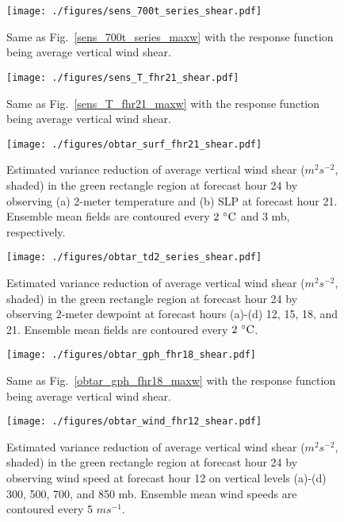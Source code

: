 \documentclass{ttuthes2007}
\begin{document}
\begin{figure}[!tb]
  \centering
  \noindent\texttt{[image: ./figures/sens\_700t\_series\_shear.pdf]}\\
  \caption{Same as Fig.~\ref{sens_700t_series_maxw} with the response function being average vertical wind shear.}
\label{sens_700t_series_shear}
\end{figure}

\begin{figure}[!tb]
  \centering
  \noindent\texttt{[image: ./figures/sens\_T\_fhr21\_shear.pdf]}\\
  \caption{Same as Fig.~\ref{sens_T_fhr21_maxw} with the response function being average vertical wind shear.}
\label{sens_T_fhr21_shear}
\end{figure}

\begin{figure}[!tb]
  \centering
  \noindent\texttt{[image: ./figures/obtar\_surf\_fhr21\_shear.pdf]}\\
  \caption{Estimated variance reduction of average vertical wind shear ($m^2 s^{-2}$, shaded) in the green rectangle region at forecast hour 24 by observing (a) 2-meter temperature and (b) SLP at forecast hour 21. Ensemble mean fields are contoured every $2^{~\circ} {\rm C}$ and 3 mb, respectively.}
\label{obtar_surf_fhr21_shear}
\end{figure}

\begin{figure}[!tb]
  \centering
  \noindent\texttt{[image: ./figures/obtar\_td2\_series\_shear.pdf]}\\
  \caption{Estimated variance reduction of average vertical wind shear ($m^2 s^{-2}$, shaded) in the green rectangle region at forecast hour 24 by observing 2-meter dewpoint at forecast hours (a)-(d) 12, 15, 18, and 21. Ensemble mean fields are contoured every $2^{~\circ} {\rm C}$.}
\label{obtar_td2_series_shear}
\end{figure}

\begin{figure}[!tb]
  \centering
  \noindent\texttt{[image: ./figures/obtar\_gph\_fhr18\_shear.pdf]}\\
  \caption{Same as Fig.~\ref{obtar_gph_fhr18_maxw} with the response function being average vertical wind shear.}
\label{obtar_gph_fhr18_shear}
\end{figure}

\begin{figure}[!tb]
  \centering
  \noindent\texttt{[image: ./figures/obtar\_wind\_fhr12\_shear.pdf]}\\
  \caption{Estimated variance reduction of average vertical wind shear ($m^2 s^{-2}$, shaded) in the green rectangle region at forecast hour 24 by observing wind speed at forecast hour 12 on vertical levels (a)-(d) 300, 500, 700, and 850 mb. Ensemble mean wind speeds are contoured every 5 $ms^{-1}$.}
\label{obtar_wind_fhr12_shear}
\end{figure}
\end{document}
